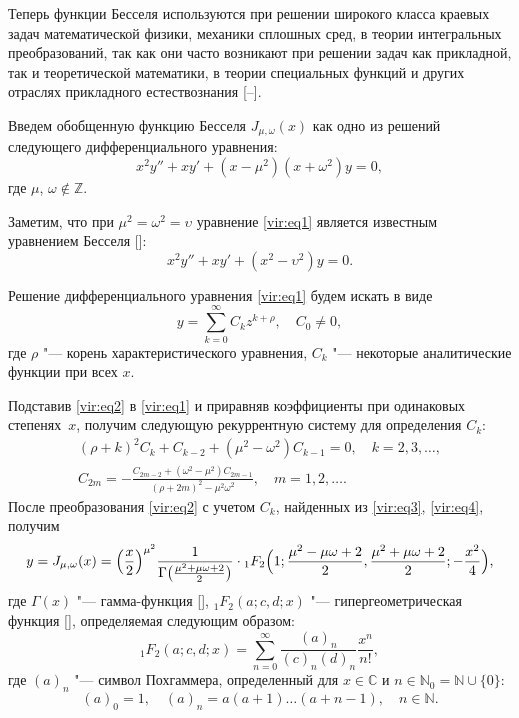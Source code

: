 Теперь функции Бесселя используются при решении широкого класса краевых  задач математической физики, механики сплошных сред, в теории интегральных  преобразований, так как они часто возникают при решении задач как прикладной, так и теоретической математики, в теории  специальных функций и других отраслях прикладного естествознания [--].


\smallskip
{}
Введем обобщенную функцию Бесселя $J_{\mu ,\omega } ( x )$ как  одно из решений следующего дифференциального уравнения: 
\begin{equation}
\label{vir:eq1}
x^2 y''+x y'+ (x-\mu ^2 )(x+\omega ^2)y=0,
\end{equation}
где $\mu$, $\omega \notin \mathbb Z$. 

Заметим, что при $\mu ^2=\omega ^2=\upsilon $ уравнение \eqref{vir:eq1} является известным  уравнением Бесселя []:
\[
x^2{y}''+x{y}'+( x^2-\upsilon ^2 )y=0.
\]

Решение дифференциального уравнения \eqref{vir:eq1} будем искать в виде 
\begin{equation}
\label{vir:eq2}
y=\sum\limits_{k=0}^\infty C_k z^{k+\rho },\quad  C_0 \ne 0, 
\end{equation}
где $\rho $ "--- корень характеристического уравнения, $C_k $ "--- некоторые аналитические 
функции при всех $x$.

Подставив \eqref{vir:eq2} в \eqref{vir:eq1} и приравняв коэффициенты при одинаковых степенях~$x$, 
получим следующую рекуррентную систему для определения $C_k $:
\begin{gather}
\label{vir:eq3}
( \rho +k )^2 C_k +C_{k-2} + (\mu ^2-\omega ^2 )C_{k-1} =0, \quad k=2, 3, \dots,
\\
\label{vir:eq4}
C_{2m} =-\frac{C_{2m-2} +( \omega ^2-\mu ^2) C_{2m-1} } {( \rho +2m )^2-\mu ^2\omega ^2}, \quad m=1, 2, \dots.
\end{gather}
После преобразования \eqref{vir:eq2} с учетом $C_k $, найденных  из \eqref{vir:eq3}, \eqref{vir:eq4}, получим
\begin{equation}
\label{vir:eq5}
y=J_{\mu ,\omega } ( x )=\Bigl( \frac{x}{2} \Bigr)^{\mu ^2}
\frac{1}{\Gamma \bigl( \frac{\mu ^2+\mu \omega +2}{2} \bigr)} \cdot{ }_1 F_2 
\Bigl( 1; \frac{\mu ^2-\mu \omega +2}{2}, \frac{\mu ^2+\mu \omega +2}{2}; -\frac{x^2}{4} \Bigr),
\end{equation}
где $\Gamma (x)$ "--- гамма-функция [], 
${ }_1 F_2 ( a; c, d; x)$ "--- гипергеометрическая функция [], определяемая следующим образом:
\begin{equation}
\label{vir:eq6}
{ }_1 F_2 (a; c, d; x )=\sum\limits_{n=0}^\infty 
\frac{( a )_n }{( c )_n ( d )_n }\frac{x^n}{n!},
\end{equation}
где $( a )_n $ "--- символ Похгаммера, определенный для $x\in \mathbb C$ и $n\in  \mathbb N_0 = \mathbb N\cup \{ 0 \}$:
\begin{equation}
\label{vir:eq7}
( a)_0 =1, \quad (a)_n =a( a+1)\dots ( a+n-1),\quad n\in \mathbb N.
\end{equation}

